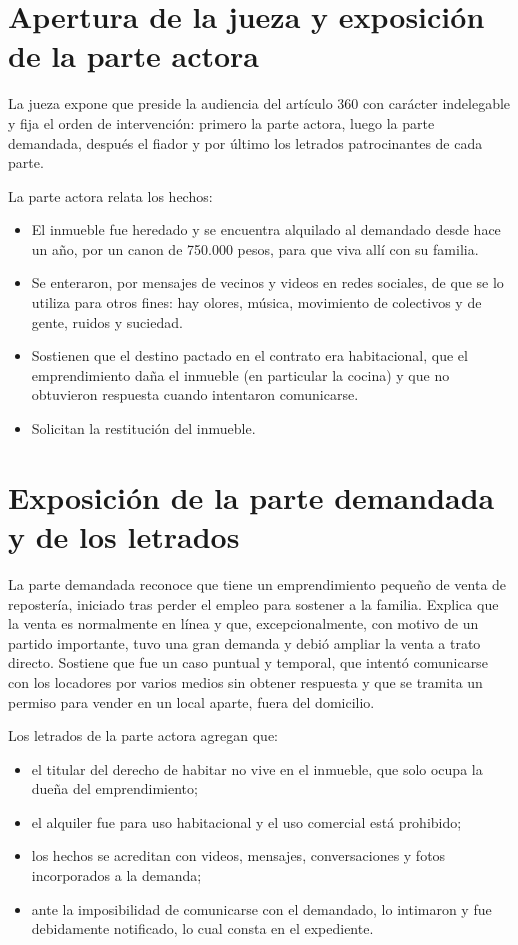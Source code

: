\documentclass[12pt,oneside]{book}
\begin{document}
\section{Apertura de la jueza y exposición de la parte actora}

La jueza expone que preside la audiencia del artículo 360 con carácter indelegable y fija el orden de intervención: primero la parte actora, luego la parte demandada, después el fiador y por último los letrados patrocinantes de cada parte.

La parte actora relata los hechos:

\begin{itemize}
    \item El inmueble fue heredado y se encuentra alquilado al demandado desde hace un año, por un canon de 750.000 pesos, para que viva allí con su familia.
    \item Se enteraron, por mensajes de vecinos y videos en redes sociales, de que se lo utiliza para otros fines: hay olores, música, movimiento de colectivos y de gente, ruidos y suciedad.
    \item Sostienen que el destino pactado en el contrato era habitacional, que el emprendimiento daña el inmueble (en particular la cocina) y que no obtuvieron respuesta cuando intentaron comunicarse.
    \item Solicitan la restitución del inmueble.
\end{itemize}

\section{Exposición de la parte demandada y de los letrados}

La parte demandada reconoce que tiene un emprendimiento pequeño de venta de repostería, iniciado tras perder el empleo para sostener a la familia. Explica que la venta es normalmente en línea y que, excepcionalmente, con motivo de un partido importante, tuvo una gran demanda y debió ampliar la venta a trato directo. Sostiene que fue un caso puntual y temporal, que intentó comunicarse con los locadores por varios medios sin obtener respuesta y que se tramita un permiso para vender en un local aparte, fuera del domicilio.

Los letrados de la parte actora agregan que:

\begin{itemize}
    \item el titular del derecho de habitar no vive en el inmueble, que solo ocupa la dueña del emprendimiento;
    \item el alquiler fue para uso habitacional y el uso comercial está prohibido;
    \item los hechos se acreditan con videos, mensajes, conversaciones y fotos incorporados a la demanda;
    \item ante la imposibilidad de comunicarse con el demandado, lo intimaron y fue debidamente notificado, lo cual consta en el expediente.
\end{itemize}
\end{document}
